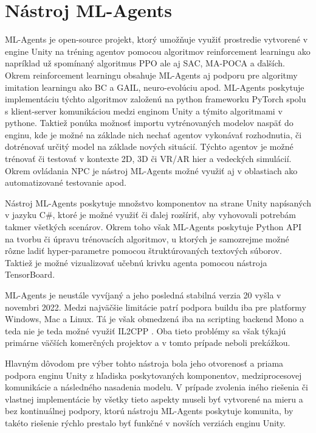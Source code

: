 \documentclass[slovak, master]{diploma}
\begin{document}
\section{Nástroj ML-Agents}
\label{sec:ML-Agents}
ML-Agents \cite{mlagents} je open-source projekt, ktorý umožňuje využiť prostredie vytvorené v engine Unity na tréning agentov pomocou algoritmov reinforcement learningu ako napríklad už spomínaný algoritmus PPO ale aj SAC, MA-POCA a ďalších. Okrem reinforcement learningu obsahuje ML-Agents aj podporu pre algoritmy imitation learningu ako BC a GAIL, neuro-evolúciu apod. ML-Agents poskytuje implementáciu týchto algoritmov založenú na python frameworku PyTorch spolu s klient-server komunikáciou medzi enginom Unity a týmito algoritmami v pythone. Taktiež ponúka možnosť importu vytrénovaných modelov naspäť do enginu, kde je možné na základe nich nechať agentov vykonávať rozhodnutia, či dotrénovať určitý model na základe nových situácií. Týchto agentov je možné trénovať či testovať v kontexte 2D, 3D či VR/AR hier a vedeckých simulácií. Okrem ovládania NPC je nástroj ML-Agents možné využiť aj v oblastiach ako automatizované testovanie apod.

Nástroj ML-Agents poskytuje množstvo komponentov na strane Unity napísaných v jazyku C\#, ktoré je možné využiť či ďalej rozšíriť, aby vyhovovali potrebám takmer všetkých scenárov. Okrem toho však ML-Agents poskytuje Python API na tvorbu či úpravu trénovacích algoritmov, u ktorých je samozrejme možné rôzne ladiť hyper-parametre pomocou štruktúrovaných textových súborov. Taktiež je možné vizualizovať učebnú krivku agenta pomocou nástroja TensorBoard.

ML-Agents je neustále vyvíjaný a jeho posledná stabilná verzia 20 vyšla v novembri 2022. Medzi najväčšie limitácie patrí podpora buildu iba pre platformy Windows, Mac a Linux. Tá je však obmedzená iba na scripting backend Mono a teda nie je teda možné využiť IL2CPP \cite{mlagentsGit}. Oba tieto problémy sa však týkajú primárne väčších komerčných projektov a v tomto prípade neboli prekážkou. 

Hlavným dôvodom pre výber tohto nástroja bola jeho otvorenosť a priama podpora enginu Unity z hľadiska poskytovaných komponentov, medziprocesovej komunikácie a následného nasadenia modelu. V prípade zvolenia iného riešenia či vlastnej implementácie by všetky tieto aspekty museli byť vytvorené na mieru a bez kontinuálnej podpory, ktorú nástroju ML-Agents poskytuje komunita, by takéto riešenie rýchlo prestalo byť funkčné v novších verziách enginu Unity.
\end{document}
